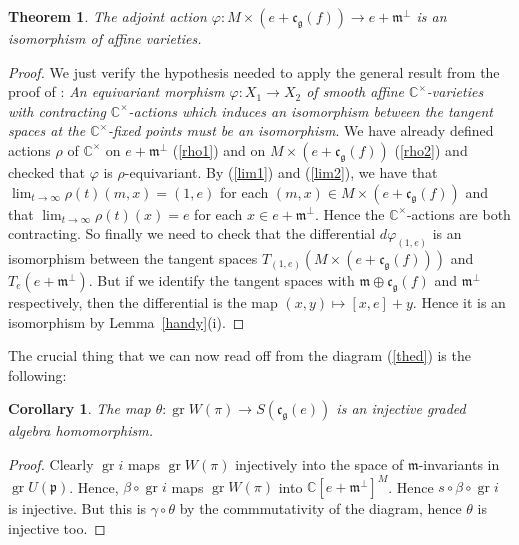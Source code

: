\documentclass[twoside,12pt,reqno]{amsart}
\newtheorem{Theorem}[Proposition]{Theorem}
\newtheorem{Corollary}[Proposition]{Corollary}
\def\C{{\mathbb C}}
\def\gr{\operatorname{gr}}
\begin{document}
\begin{Theorem}\label{adac}
The adjoint action 
$\varphi:M \times (e + \mathfrak{c}_{\mathfrak{g}}(f))
\rightarrow e + \mathfrak{m}^\perp$ is an isomorphism of affine varieties.
\end{Theorem}

\begin{proof}
We just verify the hypothesis needed to 
apply the general result from the proof of 
\cite[Lemma 2.1]{GG}:
{\em An equivariant morphism $\varphi:X_1 \rightarrow X_2$
of smooth affine $\C^\times$-varieties with contracting
$\C^\times$-actions which induces an isomorphism between the tangent
spaces at the $\C^\times$-fixed points must be an isomorphism}.
We have already defined actions $\rho$
of $\C^\times$ on $e+\mathfrak{m}^\perp$ (\ref{rho1})
and on $M \times (e+\mathfrak{c}_{\mathfrak{g}}(f))$ (\ref{rho2})
and checked that $\varphi$ is $\rho$-equivariant.
By (\ref{lim1}) and (\ref{lim2}), 
we have that
$\lim_{t \rightarrow \infty} \rho(t) (m,x) = (1,e)$
for each $(m,x) \in M \times (e+\mathfrak{c}_{\mathfrak{g}}(f))$
and that
$\lim_{t \rightarrow \infty} \rho(t)(x) = e$
for each $x \in e+\mathfrak{m}^\perp$. Hence
the $\C^\times$-actions are both contracting.
So finally we need to check that the differential 
$d\varphi_{(1,e)}$
is an isomorphism between the 
tangent spaces $T_{(1,e)}(M \times(e + \mathfrak{c}_{\mathfrak{g}}(f)))$
and $T_e(e+\mathfrak{m}^\perp)$.
But if we identify the tangent spaces with
$\mathfrak{m}\oplus \mathfrak{c}_{\mathfrak{g}}(f)$
and $\mathfrak{m}^\perp$ respectively, then the differential is the map
$(x,y) \mapsto [x,e]+y$. Hence it is an isomorphism by Lemma~\ref{handy}(i).
\end{proof}

The crucial thing that we can now read off from the
diagram (\ref{thed}) is the following:

\begin{Corollary}\label{phewy}
The map $\theta:\gr W(\pi) \rightarrow S(\mathfrak{c}_{\mathfrak{g}}(e))$
is an injective graded algebra homomorphism.
\end{Corollary}

\begin{proof}
Clearly $\gr i$ maps
$\gr W(\pi)$ injectively into the space of $\mathfrak{m}$-invariants
in $\gr U(\mathfrak{p})$.
Hence, $\beta \circ \gr i$ maps $\gr W(\pi)$
into $\C[e+\mathfrak{m}^\perp]^M$.
Hence $s \circ \beta \circ \gr i$ is injective.
But this is $\gamma \circ \theta$ by the commmutativity
of the diagram, hence $\theta$ is injective too.
\end{proof}
\end{document}
